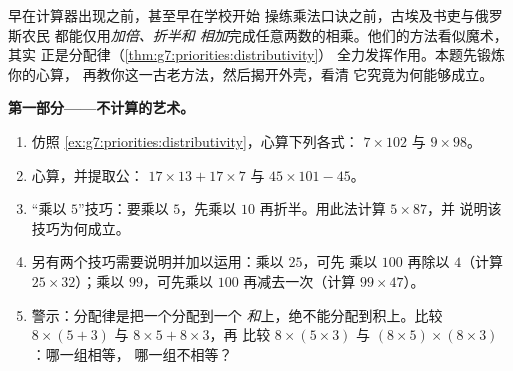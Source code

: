 \begin{problem}
\label{pb:g7:priorities:1}
早在计算器出现之前，甚至早在学校开始
操练乘法口诀之前，古埃及书吏与俄罗斯农民
都能仅用\emph{加倍、折半和
相加}完成任意两数的相乘。他们的方法看似魔术，其实
正是分配律（\cref{thm:g7:priorities:distributivity}）
全力发挥作用。本题先锻炼你的心算，
再教你这一古老方法，然后揭开外壳，看清
它究竟为何能够成立。

\medskip
\noindent\textbf{第一部分——不计算的艺术。}
\begin{enumerate}
  \item 仿照
        \cref{ex:g7:priorities:distributivity}，心算下列各式：
        $7 \times 102$ 与 $9 \times 98$。
  \item 心算，并提取公：
        $17 \times 13 + 17 \times 7$ 与
        $45 \times 101 - 45$。
  \item “乘以 $5$”技巧：要乘以 $5$，先乘以
        $10$ 再折半。用此法计算 $5 \times 87$，并
        说明该技巧为何成立。
  \item 另有两个技巧需要说明并加以运用：乘以 $25$，可先
        乘以 $100$ 再除以 $4$（计算
        $25 \times 32$）；乘以 $99$，可先乘以 $100$
        再减去一次（计算 $99 \times 47$）。
  \item 警示：分配律是把一个分配到一个
        \emph{和}上，绝不能分配到积上。比较
        $8 \times (5 + 3)$ 与 $8 \times 5 + 8 \times 3$，再
        比较 $8 \times (5 \times 3)$ 与
        $(8 \times 5) \times (8 \times 3)$：哪一组相等，
        哪一组不相等？
\end{enumerate}


\end{problem}
